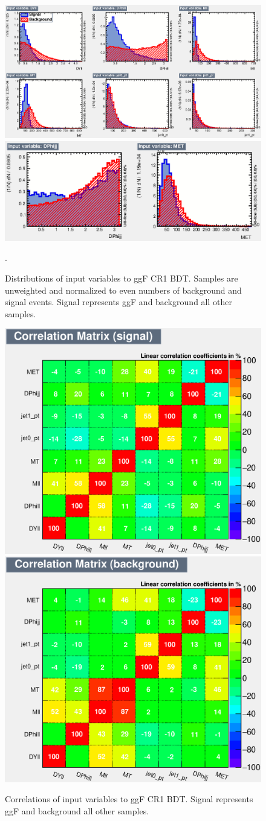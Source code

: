 \begin{figure}[!htbp]
    \centering
    \includegraphics[width=0.45\linewidth]{Pictures/ggFCR1/variables_id_c1.eps}
    \includegraphics[width=0.45\linewidth]{Pictures/ggFCR1/variables_id_c2.eps}
    \caption{Distributions of input variables to ggF CR1 BDT. Samples are unweighted and normalized to even numbers of background and signal events. Signal represents ggF and background all other samples.}.
    \label{fig:ggFCR1BDTinput}
\end{figure}
\begin{figure}[!htbp]
\centering
  \includegraphics[width=.4\linewidth]{Pictures/ggFCR1/CorrelationMatrixS.eps}
  \includegraphics[width=.4\linewidth]{Pictures/ggFCR1/CorrelationMatrixB.eps}
\caption{Correlations of input variables to ggF CR1 BDT. Signal represents ggF and background all other samples.}
\label{fig:ggFCR1corrSB}
\end{figure}

